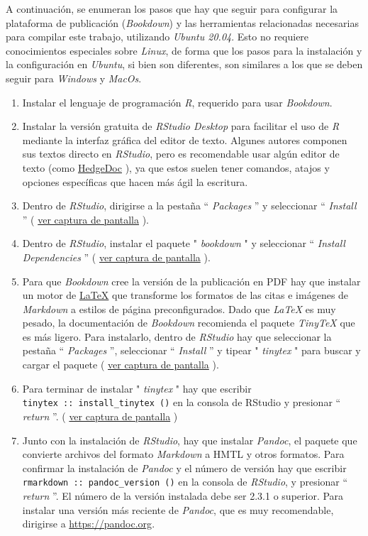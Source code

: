 \documentclass[
]{book}
\begin{document}
A continuación, se enumeran los pasos que hay que seguir para configurar la plataforma de publicación (\emph{Bookdown}) y las herramientas relacionadas necesarias para compilar este trabajo, utilizando \emph{Ubuntu 20.04}. Esto no requiere conocimientos especiales sobre \emph{Linux}, de forma que los pasos para la instalación y la configuración en \emph{Ubuntu}, si bien son diferentes, son similares a los que se deben seguir para \emph{Windows} y \emph{MacOs}.

\begin{enumerate}
\def\labelenumi{\arabic{enumi}.}
\item
  Instalar el lenguaje de programación \emph{R}, requerido para usar \emph{Bookdown}.
\item
  Instalar la versión gratuita de \emph{RStudio Desktop} para facilitar el uso de \emph{R} mediante la interfaz gráfica del editor de texto. Algunes autores componen sus textos directo en \emph{RStudio}, pero es recomendable usar algún editor de texto (como \href{https://docutopia.tupale.co/}{HedgeDoc} ), ya que estos suelen tener comandos, atajos y opciones específicas que hacen más ágil la escritura.
\item
  Dentro de \emph{RStudio}, dirigirse a la pestaña `` \emph{Packages} '' y seleccionar `` \emph{Install} '' ( \href{images/packages-install.png}{ver captura de pantalla} ).
\item
  Dentro de \emph{RStudio}, instalar el paquete " \emph{bookdown} " y seleccionar `` \emph{Install Dependencies} '' ( \href{images/bookdown-install.png}{ver captura de pantalla} ).
\item
  Para que \emph{Bookdown} cree la versión de la publicación en PDF hay que instalar un motor de \href{https://en.wikipedia.org/wiki/LaTeX}{LaTeX} que transforme los formatos de las citas e imágenes de \emph{Markdown} a estilos de página preconfigurados. Dado que \emph{LaTeX} es muy pesado, la documentación de \emph{Bookdown} recomienda el paquete \emph{TinyTeX} que es más ligero. Para instalarlo, dentro de \emph{RStudio} hay que seleccionar la pestaña `` \emph{Packages} '', seleccionar `` \emph{Install} '' y tipear " \emph{tinytex} " para buscar y cargar el paquete ( \href{images/tinytex-install.png}{ver captura de pantalla} ).
\item
  Para terminar de instalar " \emph{tinytex} " hay que escribir \texttt{tinytex\ ::\ install\_tinytex\ ()} en la consola de RStudio y presionar `` \emph{return} ''. ( \href{images/tinytex-finish.png}{ver captura de pantalla} )
\item
  Junto con la instalación de \emph{RStudio}, hay que instalar \emph{Pandoc}, el paquete que convierte archivos del formato \emph{Markdown} a HMTL y otros formatos. Para confirmar la instalación de \emph{Pandoc} y el número de versión hay que escribir \texttt{rmarkdown\ ::\ pandoc\_version\ ()} en la consola de \emph{RStudio}, y presionar `` \emph{return} ''. El número de la versión instalada debe ser 2.3.1 o superior. Para instalar una versión más reciente de \emph{Pandoc}, que es muy recomendable, dirigirse a \url{https://pandoc.org}.
\end{enumerate}
\end{document}
